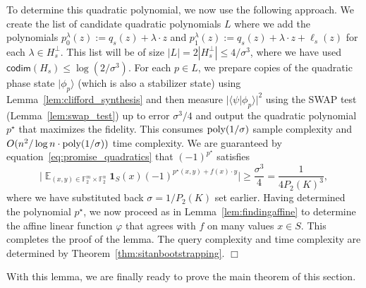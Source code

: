 \documentclass[11pt]{amsart}
\newcommand{\Exp}{\mathop{\mathbb{E}}}
\newcommand{\F}{\mathbb{F}} %
\newcommand{\one}{\mathbf{1}}
\newcommand{\poly}{\mbox{\rm poly}}
\newcommand{\ra}{\rangle}
\newcommand{\la}{\langle}
\newcommand{\ket}[1]{|#1\rangle}
\theoremstyle{plain}
\theoremstyle{definition}
\theoremstyle{remark}
\renewenvironment{proof}[1][]{
    	\begin{trivlist}
     	\item[\hspace{\labelsep}{\em\noindent Proof#1:\/}]}
     	{{\hfill$\Box$}
    	\end{trivlist}
  }
\begin{document}
\begin{proof}[ of Lemma~\ref{lem:findingfreimanquantum}]
To determine this quadratic polynomial, we now use the following approach. We create the list of candidate quadratic polynomials $L$ where we add the polynomials $p_0^\lambda(z) := q_s(z) + \lambda \cdot z$ and $p_1^\lambda(z) := q_s(z) + \lambda \cdot z + \ell_s(z)$ for each $\lambda \in H_s^\perp$. This list will be of size $|L| = 2 |H_s^\perp| \leq 4/\sigma^{3}$, where we have used $\textsf{codim}(H_s) \leq \log(2/\sigma^{3})$. For each $p \in L$, we prepare copies of the quadratic phase state $\ket{\phi_p}$ (which is also a stabilizer state) using Lemma~\ref{lem:clifford_synthesis} and then measure $|\la \psi | \phi_p \ra|^2$ using the \textsf{SWAP} test (Lemma~\ref{lem:swap_test}) up to error $\sigma^{3}/4$ and output the quadratic polynomial $p^\star$ that maximizes the fidelity. This consumes $\poly(1/\sigma)$ sample complexity and $O(n^2/\log n \cdot\poly(1/\sigma))$ time complexity. We are guaranteed by equation~\eqref{eq:promise_quadratics} that $(-1)^{p^\star}$ satisfies
\begin{equation}
\Big| \Exp_{(x,y) \in \F_2^{m} \times \F_2^n} \one_S(x) (-1)^{p^\star(x,y) + f(x)\cdot y} \Big| \geq \frac{\sigma^{3}}{4} = \frac{1}{4P_2(K)^3},    
\end{equation}
where we have substituted back $\sigma=1/P_2(K)$ set earlier. Having determined the polynomial $p^\star$, we now proceed as in Lemma~\ref{lem:findingaffine} to determine the affine linear function $\varphi$ that agrees with $f$ on many values $x \in S$. This completes the proof of the lemma. The query complexity and time complexity are determined by Theorem~\ref{thm:sitanbootstrapping}.
\end{proof}

With this lemma, we are finally ready to prove the main theorem of this section.
\end{document}
